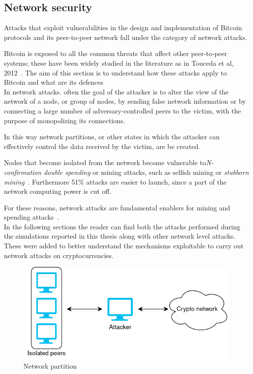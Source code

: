 \documentclass[12pt, letterpaper, twoside]{article}
\begin{document}
\subsection{Network security}\label{sec:netsec}
Attacks that exploit vulnerabilities in the design and implementation of Bitcoin protocols and its peer-to-peer network fall under the category of network attacks.

Bitcoin is exposed to all the common threats that affect other peer-to-peer systems; these have been widely studied in the literature as in Touceda et al, 2012~\cite{toucedafakeboot}. The aim of this section is to understand how these attacks apply to Bitcoin and what are its defences\\

In network attacks. often the goal of the attacker is to alter the view of the network of a node, or group of nodes, by sending false network information or by connecting a large number of adversary-controlled peers to the victim, with the purpose of monopolizing its connections.

In this way network partitions, or other states in which the attacker can effectively control the data received by the victim, are be created.

Nodes that become isolated from the network become vulnerable to\textit{N-confirmation double spending} or mining attacks, such as selfish mining or \textit{stubborn mining}~\cite{stubborn}. Furthermore 51\% attacks are easier to launch, since a part of the network computing power is cut off. 

For these reasons, network attacks are fundamental enablers for mining and spending attacks~\cite{dotan2020surveychallenges}.\\

In the following sections the reader can find both the attacks performed during the simulations reported in this thesis along with other network level attacks. These were added to better understand the mechanisms exploitable to carry out network attacks on cryptocurrencies.

\begin{figure}[h!]
	\includegraphics[width=.55\textwidth]{pict/network-partition.png}
	\centering
	\caption{Network partition}
	\label{fig:net-part}
\end{figure}
\end{document}
